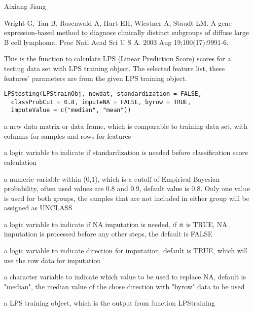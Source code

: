 \documentclass[letterpaper]{book}
\begin{document}
%
\begin{Author}\relax
Aixiang Jiang
\end{Author}
%
\begin{References}\relax
Wright G, Tan B, Rosenwald A, Hurt EH, Wiestner A, Staudt LM. A gene expression-based method
to diagnose clinically distinct subgroups of diffuse large B cell lymphoma. Proc Natl Acad Sci U S
A. 2003 Aug 19;100(17):9991-6.
\end{References}
%
\begin{Description}\relax
This is the function to calculate LPS (Linear Prediction Score) scores for a testing data set 
with LPS training object. The selected feature list, these features' parameters 
are from the given LPS training object.
\end{Description}
%
\begin{Usage}
\begin{verbatim}
LPStesting(LPStrainObj, newdat, standardization = FALSE,
  classProbCut = 0.8, imputeNA = FALSE, byrow = TRUE,
  imputeValue = c("median", "mean"))
\end{verbatim}
\end{Usage}
%
\begin{Arguments}
\begin{ldescription}
\item[\code{newdat}] a new data matrix or data frame, which is comparable to training data set, 
with columns for samples and rows for features

\item[\code{standardization}] a logic variable to indicate if standardization is needed before classification 
score calculation

\item[\code{classProbCut}] a numeric variable within (0,1), which is a cutoff of Empirical Bayesian probability, 
often used values are 0.8 and 0.9, default value is 0.8. Only one value is used for both groups, 
the samples that are not included in either group will be assigned as UNCLASS

\item[\code{imputeNA}] a logic variable to indicate if NA imputation is needed, if it is TRUE, NA imputation is 
processed before any other steps, the default is FALSE

\item[\code{byrow}] a logic variable to indicate direction for imputation, default is TRUE, 
which will use the row data for imputation

\item[\code{imputeValue}] a character variable to indicate which value to be used to replace NA, default is "median", 
the median value of the chose direction with "byrow" data to be used

\item[\code{PStraingObj}] a LPS training object, which is the output from function LPStraining
\end{ldescription}
\end{Arguments}
\end{document}
